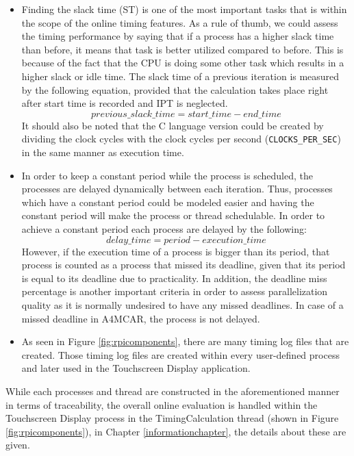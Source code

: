 \begin{itemize}
	\item Finding the slack time (ST) is one of the most important tasks that is within the scope of the online timing features. As a rule of thumb, we could assess the timing performance by saying that if a process has a higher slack time than before, it means that task is better utilized compared to before. This is because of the fact that the CPU is doing some other task which results in a higher slack or idle time. The slack time of a previous iteration is measured by the following equation, provided that the calculation takes place right after start time is recorded and IPT is neglected. 
	\begin{equation}
	previous\texttt{\_}slack\texttt{\_}time=start\texttt{\_}time - end\texttt{\_}time
	\end{equation}
	It should also be noted that the C language version could be created by dividing the clock cycles with the clock cycles per second (\texttt{CLOCKS\texttt{\_}PER\texttt{\_}SEC}) in the same manner as execution time.
	
	\item In order to keep a constant period while the process is scheduled, the processes are delayed dynamically between each iteration. Thus, processes which have a constant period could be modeled easier and having the constant period will make the process or thread schedulable. In order to achieve a constant period each process are delayed by the following:
	\begin{equation}
	delay\texttt{\_}time=period - execution\texttt{\_}time
	\end{equation}
	However, if the execution time of a process is bigger than its period, that process is counted as a process that missed its deadline, given that its period is equal to its deadline due to practicality. In addition, the deadline miss percentage is another important criteria in order to assess parallelization quality as it is normally undesired to have any missed deadlines. In case of a missed deadline in A4MCAR, the process is not delayed.
	
	\item As seen in Figure \ref{fig:rpicomponents}, there are many timing log files that are created. Those timing log files are created within every user-defined process and later used in the Touchscreen Display application.
\end{itemize}

While each processes and thread are constructed in the aforementioned manner in terms of traceability, the overall online evaluation is handled within the Touchscreen Display process in the TimingCalculation thread (shown in Figure \ref{fig:rpicomponents}),  in Chapter \ref{informationchapter}, the details about these are given.

